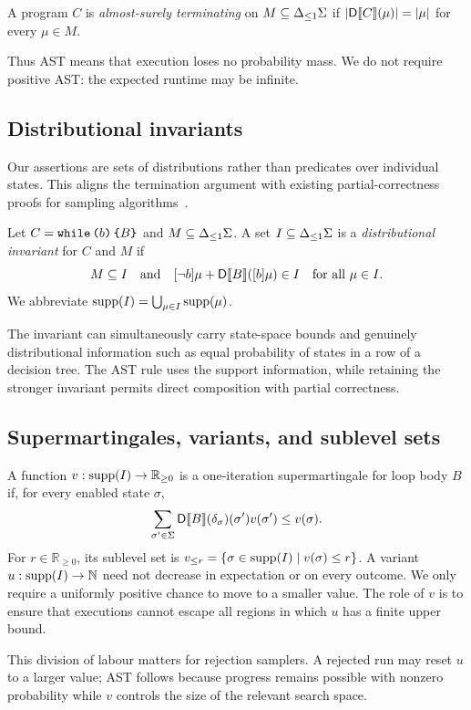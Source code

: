 \begin{definition}
A program $C$ is \emph{almost-surely terminating} on $M\subseteq{\Delta_{\leq 1}\Sigma}$ if
$|\mathsf{D}\llbracket C\rrbracket(\mu)|=|\mu|$ for every $\mu\in M$.
\end{definition}

Thus AST means that execution loses no probability mass. We do not require positive AST: the expected runtime may be infinite.

\subsection{Distributional invariants}

Our assertions are sets of distributions rather than predicates over individual states. This aligns the termination argument with existing partial-correctness proofs for sampling algorithms~\cite{zilken2026verifyingsamplingalgorithmsdistributional}.

\begin{definition}
Let $C=\textnormal{\texttt{while}}\,\textnormal{\texttt{(}} b\textnormal{\texttt{)}}\,\textnormal{\texttt{\{}} B\textnormal{\texttt{\}}}$ and $M\subseteq{\Delta_{\leq 1}\Sigma}$. A set $I\subseteq{\Delta_{\leq 1}\Sigma}$ is a \emph{distributional invariant} for $C$ and $M$ if
\[
 M\subseteq I
 \quad\text{and}\quad
 [\neg b]\mu+\mathsf{D}\llbracket B\rrbracket([b]\mu)\in I
 \quad\text{for all }\mu\in I.
\]
We abbreviate $\textnormal{supp}(I)=\bigcup_{\mu\in I}\textnormal{supp}(\mu)$.
\end{definition}

The invariant can simultaneously carry state-space bounds and genuinely distributional information such as equal probability of states in a row of a decision tree. The AST rule uses the support information, while retaining the stronger invariant permits direct composition with partial correctness.

\subsection{Supermartingales, variants, and sublevel sets}

A function $v:\textnormal{supp}(I)\to\mathbb{R}_{\geq0}$ is a one-iteration supermartingale for loop body $B$ if, for every enabled state $\sigma$,
\[
  \sum_{\sigma'\in\Sigma}\mathsf{D}\llbracket B\rrbracket(\delta_{\sigma})(\sigma')v(\sigma')\leq v(\sigma).
\]
For $r\in\mathbb{R}_{\geq0}$, its sublevel set is
$v_{\leq r}=\{\sigma\in\textnormal{supp}(I)\mid v(\sigma)\leq r\}$.
A variant $u:\textnormal{supp}(I)\to\mathbb{N}$ need not decrease in expectation or on every outcome. We only require a uniformly positive chance to move to a smaller value. The role of $v$ is to ensure that executions cannot escape all regions in which $u$ has a finite upper bound.

This division of labour matters for rejection samplers. A rejected run may reset $u$ to a larger value; AST follows because progress remains possible with nonzero probability while $v$ controls the size of the relevant search space.
